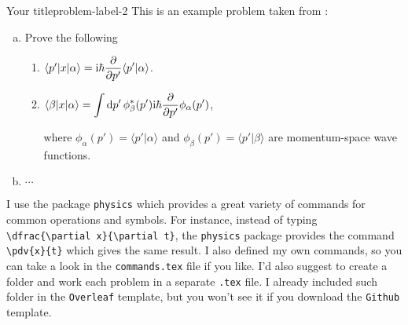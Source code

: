 \begin{problem}{Your title}{problem-label-2}
This is an example problem taken from \cite{Sakurai2020}:

\begin{enumerate}[(a)]
    \item Prove the following
    \begin{enumerate}[label = (\roman*)]
        \item $\langle p' | x | \alpha \rangle = \mathrm{i} \hbar \displaystyle{\pdv{}{p'} }\langle p' | \alpha \rangle$.

        \item $\langle \beta | x | \alpha \rangle = \displaystyle{\int \dd{p'} \phi_{\beta}^{*} (p') \mathrm{i}\hbar \pdv{}{p'} \phi_{\alpha} (p')}$, 

        \vspace{1ex}

        where $\phi_{\alpha}(p') = \langle p' | \alpha \rangle$ and $\phi_{\beta}(p') = \langle p' | \beta \rangle$ are momentum-space wave functions.
    \end{enumerate}

    \item $\cdots$
\end{enumerate}
\end{problem}

I use the package \texttt{physics} which provides a great variety of commands for common operations and symbols. For instance, instead of typing \verb|\dfrac{\partial x}{\partial t}|, the \texttt{physics} package provides the command \verb|\pdv{x}{t}| which gives the same result. I also defined my own commands, so you can take a look in the \texttt{commands.tex} file if you like. I'd also suggest to create a folder and work each problem in a separate \texttt{.tex} file. I already included such folder in the \texttt{Overleaf} template, but you won't see it if you download the \texttt{Github} template. 








